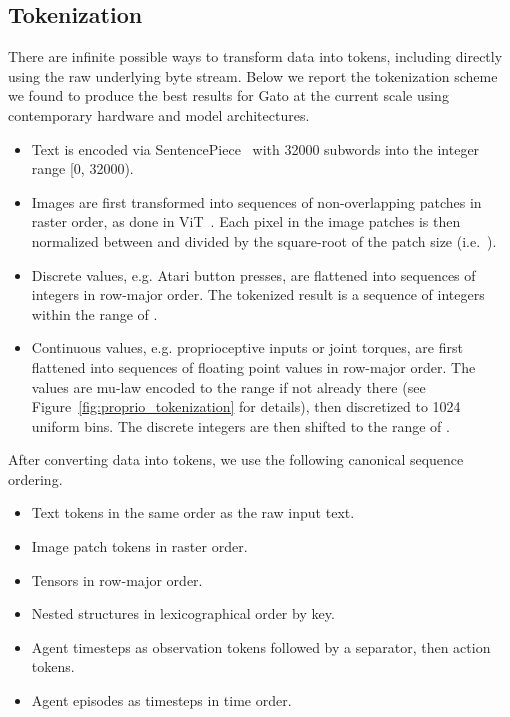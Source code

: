 \documentclass[10pt]{article} \usepackage[accepted]{tmlr}
\newcommand{\model}{{Gato}}
\begin{document}
\subsection{Tokenization}\label{sec:tokenization}
\vskip 0.2cm
There are infinite possible ways to transform data into tokens, including directly using the raw underlying byte stream.
Below we report the tokenization scheme we found to produce the best results for \model{} at the current scale using contemporary hardware and model architectures.
\begin{itemize}
    \item Text is encoded via SentencePiece~\citep{kudo-richardson-2018-sentencepiece} with 32000 subwords into the integer range [0, 32000).
    \item Images are first transformed into sequences of non-overlapping  patches in raster order, as done in ViT~\citep{dosovitskiy2020image}. Each pixel in the image patches is then normalized between  and divided by the square-root of the patch size (i.e.\ ).
    \item Discrete values, e.g. Atari button presses, are flattened into sequences of integers in row-major order. The tokenized result is a sequence of integers within the range of .
    \item Continuous values, e.g. proprioceptive inputs or joint torques, are first flattened into sequences of floating point values in row-major order. The values are mu-law encoded to the range   if not already there (see Figure~\ref{fig:proprio_tokenization} for details), then discretized to 1024 uniform bins. The discrete integers are then shifted to the range of . 
\end{itemize}

\noindent After converting data into tokens, we use the following canonical sequence ordering.
\begin{itemize}
    \item Text tokens in the same order as the raw input text.
    \item Image patch tokens in raster order.
    \item Tensors in row-major order.
    \item Nested structures in lexicographical order by key.
    \item Agent timesteps as observation tokens followed by a separator, then action tokens.
    \item Agent episodes as timesteps in time order.
\end{itemize}
\end{document}
